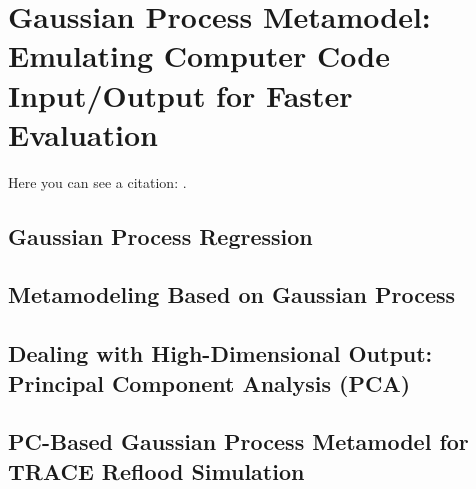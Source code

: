 \chapter{Gaussian Process Metamodel: \\
Emulating Computer Code Input/Output for Faster Evaluation}

Here you can see a citation: \cite{atc13}.

\section{Gaussian Process Regression}

\section{Metamodeling Based on Gaussian Process}

\section{Dealing with High-Dimensional Output: Principal Component Analysis (PCA)}

\section{PC-Based Gaussian Process Metamodel for TRACE Reflood Simulation}

\lipsum[7]
